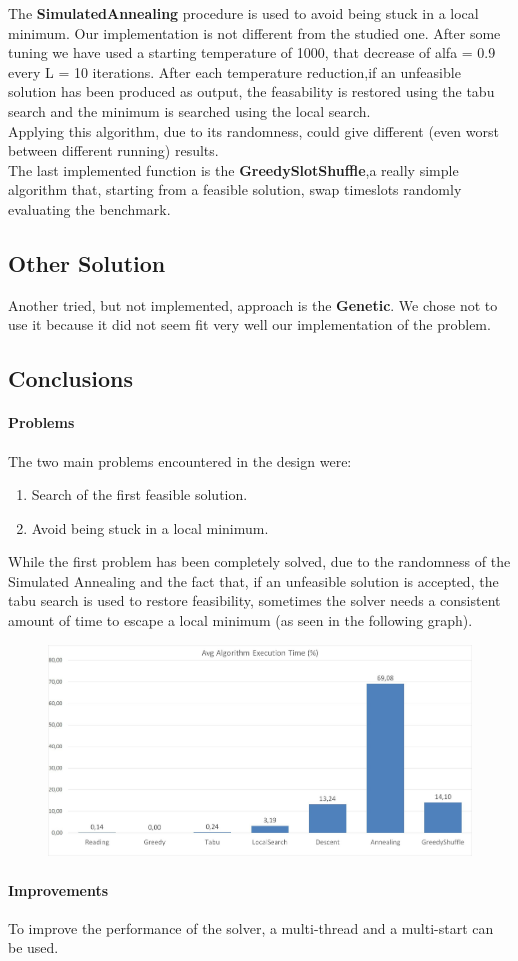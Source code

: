 \documentclass[12pt]{article}
\begin{document}
The \textbf{SimulatedAnnealing} procedure is used to avoid being stuck in a local minimum.
Our implementation is not different from the studied one. After some tuning we have used a starting temperature of 1000, that decrease of alfa = 0.9 every L = 10 iterations. After each temperature reduction,if an unfeasible solution has been produced as output, the feasability is restored using the tabu search and the minimum is searched using the local search.\\
Applying this algorithm, due to its randomness, could give different (even worst between different running) results.\\

The last implemented function is the \textbf{GreedySlotShuffle},a really simple algorithm that, starting from a feasible solution, swap timeslots randomly evaluating the benchmark.
\subsection{Other Solution}
Another tried, but not implemented, approach is the \textbf{Genetic}. We chose not to use it because it did not seem fit very well our implementation of the problem.

\subsection{Conclusions}
\paragraph{Problems}
The two main problems encountered in the design were:
\begin{enumerate}
  \item Search of the first feasible solution.
  \item Avoid being stuck in a local minimum.
\end{enumerate}
While the first problem has been completely solved, due to the randomness of the Simulated Annealing and the fact that, if an unfeasible solution is accepted, the tabu search is used to restore feasibility, sometimes the solver needs a consistent amount of time to escape a local minimum (as seen in the following graph).

\begin{figure}[H]
	\centering
	\includegraphics[width=\linewidth]{images/timeExec.jpg}
\end{figure}

\paragraph{Improvements}
To improve the performance of the solver, a multi-thread and a multi-start can be used.
\end{document}
